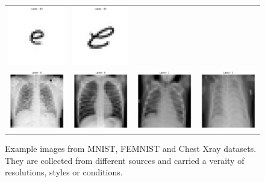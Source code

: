 \documentclass[journal]{IEEEtai}
\begin{document}
\begin{figure}[h]
\begin{tabular}{@{}cccc@{}}
		\includegraphics[width=.21\columnwidth]{Figures/femnist/IMGS/client:14label:40} &
		\includegraphics[width=.21\columnwidth]{Figures/femnist/IMGS/client:24label:40} \\
		\includegraphics[width=.21\columnwidth]{Figures/xray/IMGS/client:0label:0} &
		\includegraphics[width=.21\columnwidth]{Figures/xray/IMGS/client:3label:0} &
		\includegraphics[width=.21\columnwidth]{Figures/xray/IMGS/client:13label:1} &
		\includegraphics[width=.21\columnwidth]{Figures/xray/IMGS/client:8label:1} \\
	\end{tabular}
	\caption{Example images from MNIST, FEMNIST and Chest Xray datasets. They are collected from different sources and carried a veraity of resolutions, styles or conditions.}
	\label{fig:examples}
\end{figure}
\end{document}
